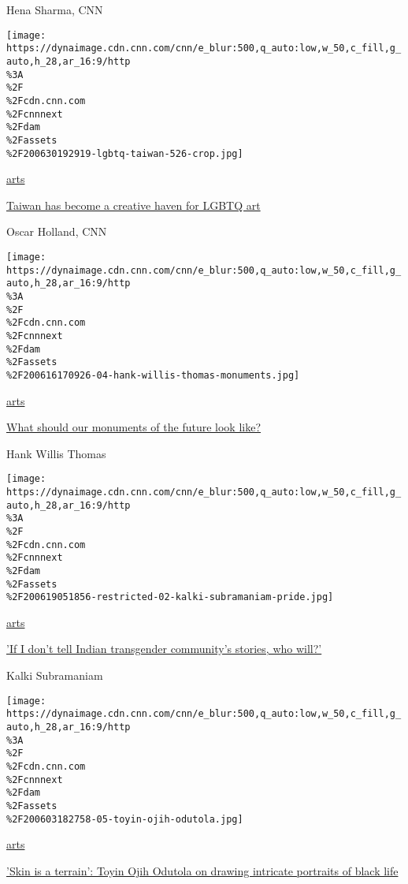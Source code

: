 Hena Sharma, CNN

\href{/style/article/lgbtq-artists-taiwan/index.html}{}

\texttt{[image: https://dynaimage.cdn.cnn.com/cnn/e\_blur:500,q\_auto:low,w\_50,c\_fill,g\_auto,h\_28,ar\_16:9/http\\\%3A\\\%2F\\\%2Fcdn.cnn.com\\\%2Fcnnnext\\\%2Fdam\\\%2Fassets\\\%2F200630192919-lgbtq-taiwan-526-crop.jpg]}

\href{/style/arts}{arts}

\href{/style/article/lgbtq-artists-taiwan/index.html}{Taiwan has become
a creative haven for LGBTQ art}

Oscar Holland, CNN

\href{/style/article/what-should-our-monuments-of-the-future-look-like-hank-willis-thomas/index.html}{}

\texttt{[image: https://dynaimage.cdn.cnn.com/cnn/e\_blur:500,q\_auto:low,w\_50,c\_fill,g\_auto,h\_28,ar\_16:9/http\\\%3A\\\%2F\\\%2Fcdn.cnn.com\\\%2Fcnnnext\\\%2Fdam\\\%2Fassets\\\%2F200616170926-04-hank-willis-thomas-monuments.jpg]}

\href{/style/arts}{arts}

\href{/style/article/what-should-our-monuments-of-the-future-look-like-hank-willis-thomas/index.html}{What
should our monuments of the future look like?}

Hank Willis Thomas

\href{/style/article/kalki-subramaniam-opinion/index.html}{}

\texttt{[image: https://dynaimage.cdn.cnn.com/cnn/e\_blur:500,q\_auto:low,w\_50,c\_fill,g\_auto,h\_28,ar\_16:9/http\\\%3A\\\%2F\\\%2Fcdn.cnn.com\\\%2Fcnnnext\\\%2Fdam\\\%2Fassets\\\%2F200619051856-restricted-02-kalki-subramaniam-pride.jpg]}

\href{/style/arts}{arts}

\href{/style/article/kalki-subramaniam-opinion/index.html}{'If I don't
tell Indian transgender community's stories, who will?'}

Kalki Subramaniam

\href{/style/article/toyin-ojih-odutola-new-shows/index.html}{}

\texttt{[image: https://dynaimage.cdn.cnn.com/cnn/e\_blur:500,q\_auto:low,w\_50,c\_fill,g\_auto,h\_28,ar\_16:9/http\\\%3A\\\%2F\\\%2Fcdn.cnn.com\\\%2Fcnnnext\\\%2Fdam\\\%2Fassets\\\%2F200603182758-05-toyin-ojih-odutola.jpg]}

\href{/style/arts}{arts}

\href{/style/article/toyin-ojih-odutola-new-shows/index.html}{'Skin is a
terrain': Toyin Ojih Odutola on drawing intricate portraits of black
life}

